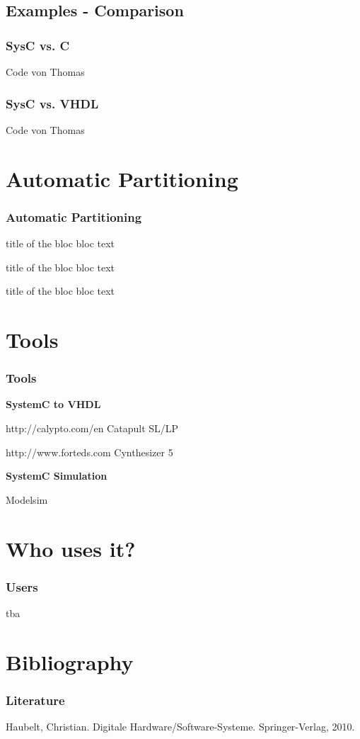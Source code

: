 \documentclass{beamer}
\begin{document}
\subsection{Examples - Comparison}
\begin{frame}\frametitle{SysC vs. C} 
Code von Thomas
\end{frame}
\begin{frame}\frametitle{SysC vs. VHDL} 
Code von Thomas
\end{frame}


\section{Automatic Partitioning}
\begin{frame}\frametitle{Automatic Partitioning} 

\begin{block}{title of the bloc}
bloc text
\end{block}

\begin{exampleblock}{title of the bloc}
bloc text
\end{exampleblock}


\begin{alertblock}{title of the bloc}
bloc text
\end{alertblock}
\end{frame}

\section{Tools}
\begin{frame}\frametitle{Tools} 
\textbf{SystemC to VHDL}

http://calypto.com/en 	Catapult SL/LP

http://www.forteds.com	Cynthesizer 5 

\textbf{SystemC Simulation}

Modelsim
\end{frame}

\section{Who uses it?}
\begin{frame}\frametitle{Users} 
tba
\end{frame}
      
\section{Bibliography}
\begin{frame}\frametitle{Literature} 
Haubelt, Christian. Digitale Hardware/Software-Systeme. Springer-Verlag, 2010.
\end{frame}
\end{document}
